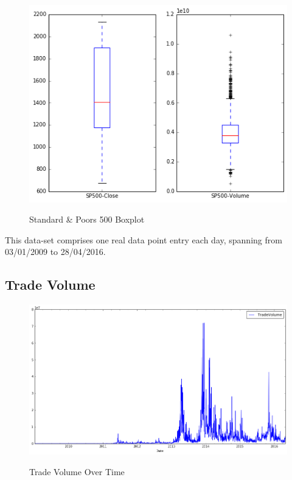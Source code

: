 \begin{figure}[bth]
  \myfloatalign
  {\includegraphics[width=1\linewidth]
    {gfx/standard-and-poors-500-boxplot}}
  \caption{Standard \& Poors 500 Boxplot}
  \label{fig:standard-and-poors-500-boxplot}
\end{figure}

This data-set comprises one real data point entry each day, spanning
from 03/01/2009 to 28/04/2016.

\clearpage

\subsection{Trade Volume}
\label{sec:trade-volume}

\begin{figure}[bth]
  \myfloatalign
  {\includegraphics[width=1\linewidth]
    {gfx/trade-volume-over-time}}
  \caption{Trade Volume
    Over Time}
  \label{fig:trade-volume-over-time}
\end{figure}

